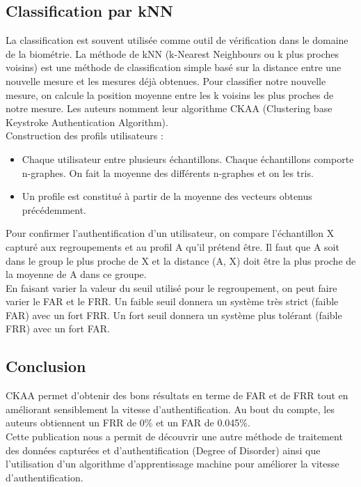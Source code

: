\subsection{Classification par kNN}

La classification est souvent utilisée comme outil de vérification dans le domaine de la biométrie. La méthode de kNN (k-Nearest Neighbours ou k plus proches voisins) est une méthode de classification simple basé sur la distance entre une nouvelle mesure et les mesures déjà obtenues. Pour classifier notre nouvelle mesure, on calcule la position moyenne entre les k voisins les plus proches de notre mesure. Les auteurs nomment leur algorithme CKAA (Clustering base Keystroke Authentication Algorithm).\\

Construction des profils utilisateurs :\\

\begin{itemize}
  \item Chaque utilisateur entre plusieurs échantillons. Chaque échantillons comporte n-graphes. On fait la moyenne des différents n-graphes et on les tris.
  \item Un profile est constitué à partir de la moyenne des vecteurs obtenus précédemment.\\
\end{itemize}

Pour confirmer l'authentification d'un utilisateur, on compare l'échantillon X capturé aux regroupements et au profil A qu'il prétend être. Il faut que A soit dans le group le plus proche de X et la distance (A, X) doit être la plus proche de la moyenne de A dans ce groupe.\\

En faisant varier la valeur du seuil utilisé pour le regroupement, on peut faire varier le FAR et le FRR. Un faible seuil donnera un système très strict (faible FAR) avec un fort FRR. Un fort seuil donnera un système plus tolérant (faible FRR) avec un fort FAR.

\subsection{Conclusion}

CKAA permet d'obtenir des bons résultats en terme de FAR et de FRR tout en améliorant sensiblement la vitesse d'authentification. Au bout du compte, les auteurs obtiennent un FRR de 0\% et un FAR de 0.045\%.\\

Cette publication nous a permit de découvrir une autre méthode de traitement des données capturées et d'authentification (Degree of Disorder) ainsi que l'utilisation d'un algorithme d'apprentissage machine pour améliorer la vitesse d'authentification.
